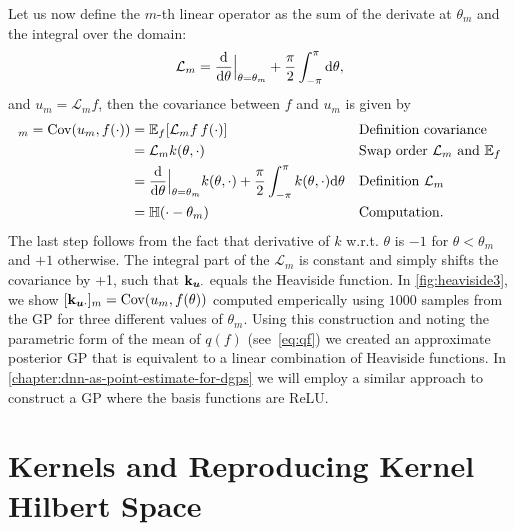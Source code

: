 Let us now define the $m$-th linear operator as the sum of the derivate at $\theta_m$ and the integral over the domain:
\begin{equation}
  \mathcal{L}_m = \frac{\mathrm{d}{}}{\mathrm{d}{\theta}}\Bigr|_{\theta = \theta_m} + \frac{\pi}{2} \int_{-\pi}^{\pi} \mathrm{d}{\theta},
\end{equation}
and $u_m = \mathcal{L}_m f$, then the covariance between $f$ and $u_m$ is given by
\begin{align}
  [\kux]_m = \Cov(u_m, f(\cdot)) &= \Exp{f}{\mathcal{L}_m f\,f(\cdot)} && \text{Definition covariance} \\
                      &=  \mathcal{L}_m k(\theta, \cdot)  && \text{Swap order $\mathcal{L}_m$ and $\mathbb{E}_f$} \\
                      &= \frac{\calcd{}}{\calcd{\theta}}\Bigr|_{\theta = \theta_m} k(\theta, \cdot) + \frac{\pi}{2} \int_{-\pi}^\pi k(\theta, \cdot) \calcd{\theta} && \text{Definition $\mathcal{L}_m$} \\
                      &= \mathbb{H}(\cdot - \theta_m) && \text{Computation}.
\end{align}
The last step follows from the fact that derivative of $k$ w.r.t. $\theta$ is $-1$ for $\theta < \theta_m$ and $+1$ otherwise. The integral part of the $\mathcal{L}_m$ is constant and simply shifts the covariance by +1, such that $\mathbf{k}_{\bm{u} \cdot}$ equals the Heaviside function. In \cref{fig:heaviside3}, we show $[\mathbf{k}_{\bm{u} \cdot}]_m = \mathrm{Cov}(u_m, f(\theta))$ computed emperically using $1000$ samples from the GP for three different values of $\theta_m$. Using this construction and noting the parametric form of the mean of $q(f)$ (see~\cref{eq:qf}) we created an approximate posterior GP that is equivalent to a linear combination of Heaviside functions. In \cref{chapter:dnn-as-point-estimate-for-dgps} we will employ a similar approach to construct a GP where the basis functions are ReLU.



\section{Kernels and Reproducing Kernel Hilbert Space}


